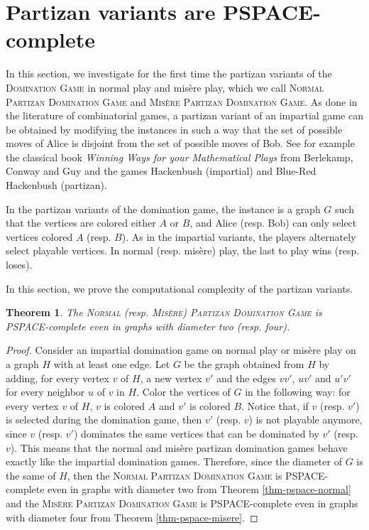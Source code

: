 \documentclass[12pt]{article}
\newtheorem{theorem}{Theorem}[section]
\begin{document}
\section{Partizan variants are PSPACE-complete}

In this section, we investigate for the first time the partizan variants of the \textsc{Domination Game} in normal play and misère play, which we call \textsc{Normal Partizan Domination Game} and \textsc{Misère Partizan Domination Game}.
As done in the literature of combinatorial games, a partizan variant of an impartial game can be obtained by modifying the instances in such a way that the set of possible moves of Alice is disjoint from the set of possible moves of Bob.
See for example the classical book \emph{Winning Ways for your Mathematical Plays} from Berlekamp, Conway and Guy \cite{conway82} and the games Hackenbush (impartial) and Blue-Red Hackenbush (partizan).

In the partizan variants of the domination game, the instance is a graph $G$ such that the vertices are colored either $A$ or $B$, and Alice (resp. Bob) can only select vertices colored $A$ (resp. $B$). As in the impartial variants, the players alternately select playable vertices. In normal (resp. misère) play, the last to play wins (resp. loses).

In this section, we prove the computational complexity of the partizan variants.

\begin{theorem}
The \textsc{Normal} (resp. \textsc{Misère}) \textsc{Partizan Domination Game} is \emph{PSPACE}-complete even in graphs with diameter two (resp. four).
\end{theorem}

\begin{proof}
Consider an impartial domination game on normal play or misère play on a graph $H$ with at least one edge. Let $G$ be the graph obtained from $H$ by adding, for every vertex $v$ of $H$, a new vertex $v'$ and the edges $vv'$, $uv'$ and $u'v'$ for every neighbor $u$ of $v$ in $H$. Color the vertices of $G$ in the following way: for every vertex $v$ of $H$, $v$ is colored $A$ and $v'$ is colored $B$. Notice that, if $v$ (resp. $v'$) is selected during the domination game, then $v'$ (resp. $v$) is not playable anymore, since $v$ (resp. $v'$) dominates the same vertices that can be dominated by $v'$ (resp. $v$). This means that the normal and misère partizan domination games behave exactly like the impartial domination games. Therefore, since the diameter of $G$ is the same of $H$, then the \textsc{Normal Partizan Domination Game} is PSPACE-complete even in graphs with diameter two from Theorem \ref{thm-pspace-normal} and the \textsc{Misère Partizan Domination Game} is PSPACE-complete even in graphs with diameter four from Theorem \ref{thm-pspace-misere}.
\end{proof}
\end{document}
